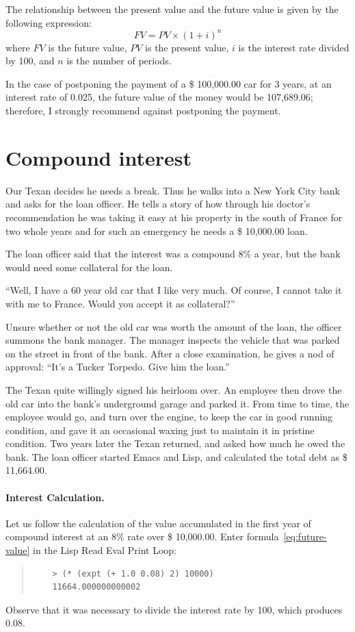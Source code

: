 \documentclass[a4paper,12pt]{book}
\begin{document}
The relationship between the present value
and the future value is given by the
following expression:
\begin{equation}
	FV= PV\times (1+i)^n
	\label{eq:future-value}
\end{equation}
where $FV$ is the future value, $PV$ is the present
value, $i$ is the interest rate divided by 100,
and $n$ is the number of periods.

In the case of postponing the payment of a \$ 100,000.00 car
for 3 years, at an interest rate of 0.025, the future
value of the money would be 107,689.06; therefore,
I strongly recommend against postponing the payment.

\section{Compound interest}

Our Texan decides he needs a break. Thus he walks into
a New York City bank and asks for the loan officer.
He tells a story of how through his doctor's recommendation
he was taking it easy at his property in the south of
France for two whole years and for such an 
emergency he needs a \$ 10,000.00 loan.

The loan officer said that the interest was a compound 8\%
a year, but the bank would need some collateral for the loan.

“Well, I have a 60 year old car that I like very much.
Of course, I cannot take it with me to France.
Would you accept it as collateral?”

Unsure whether or not the old car was worth the
amount of the loan, the officer summons the bank manager.
The manager inspects the vehicle that was parked on the
street in front of the bank. After a close examination,
he gives a nod of approval: “It’s a Tucker Torpedo.
Give him the loan.”

The Texan quite willingly signed his heirloom over.
An employee then drove the old car into the bank’s
underground garage and parked it. From time to time,
the employee would go, and turn over the engine, to keep
the car in good running condition, and gave it an
occasional waxing just to maintain it in pristine condition.
Two years later the Texan returned, and asked how
much he owed the bank. The loan officer started Emacs and
Lisp, and calculated the total debt as \$ 11,664.00.

\paragraph{Interest Calculation.}
Let us follow the calculation of the value accumulated
in the first year of compound interest at an 8\% rate
over \$ 10,000.00. Enter formula~\ref{eq:future-value} in
the Lisp Read Eval Print Loop:
\begin{quote}
	\begin{verbatim}
	> (* (expt (+ 1.0 0.08) 2) 10000)
	11664.000000000002
	\end{verbatim}
\end{quote}
Observe that it was necessary to divide the
interest rate by 100, which produces 0.08.
\end{document}
